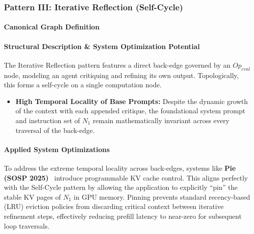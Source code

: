 \subsubsection{Pattern III: Iterative Reflection (Self-Cycle)}

\paragraph{Canonical Graph Definition}
\begin{center}
\end{center}

\paragraph{Structural Description \& System Optimization Potential}
The Iterative Reflection pattern features a direct back-edge governed by an $Op_{eval}$ node, modeling an agent critiquing and refining its own output. Topologically, this forms a self-cycle on a single computation node.
\begin{itemize}
    \item \textbf{High Temporal Locality of Base Prompts:} Despite the dynamic growth of the context with each appended critique, the foundational system prompt and instruction set of $N_1$ remain mathematically invariant across every traversal of the back-edge.
\end{itemize}

\paragraph{Applied System Optimizations}
To address the extreme temporal locality across back-edges, systems like \textbf{Pie (SOSP 2025)}~\citep{gim2025pie} introduce programmable KV cache control. This aligns perfectly with the Self-Cycle pattern by allowing the application to explicitly ``pin'' the stable KV pages of $N_1$ in GPU memory. Pinning prevents standard recency-based (LRU) eviction policies from discarding critical context between iterative refinement steps, effectively reducing prefill latency to near-zero for subsequent loop traversals.

